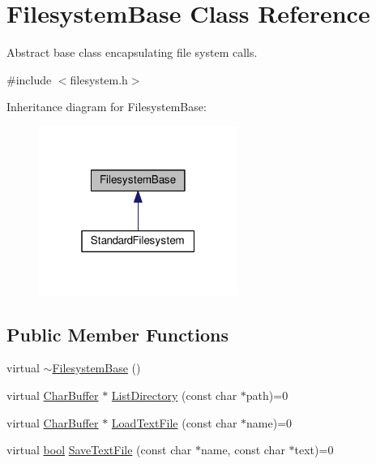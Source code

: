\hypertarget{classFilesystemBase}{}\section{Filesystem\+Base Class Reference}
\label{classFilesystemBase}


Abstract base class encapsulating file system calls.  




{\ttfamily \#include $<$filesystem.\+h$>$}



Inheritance diagram for Filesystem\+Base\+:\nopagebreak
\begin{figure}[H]
\begin{center}
\leavevmode
\includegraphics[width=184pt]{classFilesystemBase__inherit__graph}
\end{center}
\end{figure}
\subsection*{Public Member Functions}
\begin{DoxyCompactItemize}
\item 
virtual \hyperlink{classFilesystemBase_ad82ff955f62368b9e631f2a39a6f47d1}{$\sim$\+Filesystem\+Base} ()
\item 
virtual \hyperlink{classCharBuffer}{Char\+Buffer} $\ast$ \hyperlink{classFilesystemBase_a2f48a44b0b99b3c23e7c1a7587b5fc9c}{List\+Directory} (const char $\ast$path)=0
\item 
virtual \hyperlink{classCharBuffer}{Char\+Buffer} $\ast$ \hyperlink{classFilesystemBase_adc4a9e1dc189bcd221e3b994bc854d46}{Load\+Text\+File} (const char $\ast$name)=0
\item 
virtual \hyperlink{platform_8h_a1062901a7428fdd9c7f180f5e01ea056}{bool} \hyperlink{classFilesystemBase_a66b54f8151cd8903ac757207b062ef48}{Save\+Text\+File} (const char $\ast$name, const char $\ast$text)=0
\end{DoxyCompactItemize}


